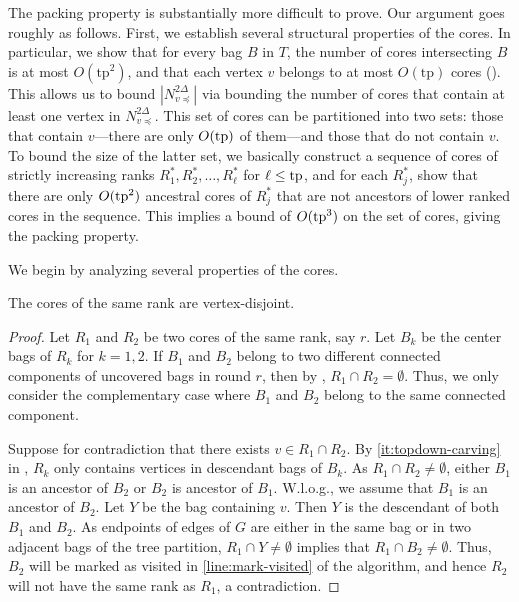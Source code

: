 \documentclass{article}
\newcommand{\tp}{{\rm tp}}
\begin{document}
The packing property is substantially more difficult to prove. Our argument goes roughly as follows. First, we establish several structural properties of the cores. In particular, we show that for every bag $B$ in $T$, the number of cores intersecting $B$ is at most $O(\mathrm{tp}^2)$, and that each vertex $v$ belongs to at most $O(\mathrm{tp})$ cores (). This allows us to bound $\left|N_{v\preceq}^{2\Delta}\right|$ via bounding the number of cores that contain at least one vertex in $N_{v\preceq}^{2\Delta}$. This set of cores can be partitioned into two sets: those that contain $v$---there are only $O(\tp)$ of them---and those that do not contain $v$. To bound the size of the latter set, we basically construct a sequence of cores of strictly increasing ranks $R_1^*, R_2^*, \ldots, R_\ell^*$ for $\ell \leq \tp$, and for each $R_j^*$, show that there are only $O(\tp^2)$ ancestral cores of $R_j^*$ that are not ancestors of lower ranked cores in the sequence. This implies a bound of $O(\tp^3)$ on the set of cores, giving the packing property.

We begin by analyzing several properties of the cores. 

\begin{lemma}  \label{lemma::coresDisjointRank}The cores of the same rank are vertex-disjoint.  
\end{lemma}
\begin{proof}  
 Let $R_1$ and $R_2$ be two cores of the same rank, say $r$. Let $B_k$ be the center bags of $R_k$ for $k=1,2$.  If $B_1$ and $B_2$ belong to two different connected components of uncovered bags in round $r$, then by , $R_1\cap R_2 = \emptyset$. Thus, we only consider the complementary case where $B_1$ and $B_2$ belong to the same connected component.  
	
	Suppose for contradiction that there exists $v\in R_1\cap R_2$. By \cref{it:topdown-carving} in , $R_k$ only contains vertices in descendant bags of $B_k$.  As $R_1\cap R_2 \not=\emptyset$,  either $B_1$ is an ancestor of $B_2$ or $B_2$ is ancestor of $B_1$. W.l.o.g., we assume that $B_1$ is an ancestor of $B_2$. Let $Y$ be the bag containing $v$. Then $Y$ is the descendant of both $B_1$ and $B_2$. As endpoints of edges of $G$ are either in the same bag or in two adjacent bags of the tree partition, $R_1\cap Y \not=\emptyset$ implies that $R_1\cap B_2\not=\emptyset$. Thus, $B_2$ will be marked as visited in \cref{line:mark-visited} of the algorithm, and hence $R_2$ will not have the same rank as $R_1$, a contradiction.  
\end{proof}
\end{document}
